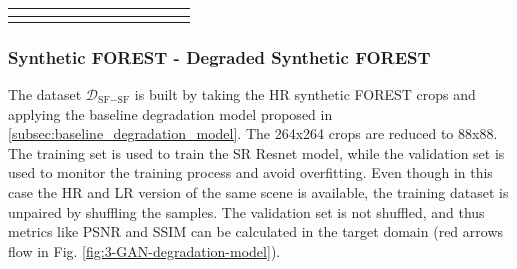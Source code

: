\begin{table}[H]
{\begin{tabular}{c|cccc|cccc|cccc}
                & \multicolumn{1}{c|}{}                                                        & \multicolumn{1}{c|}{}                                                                  &                                                        &                                                                   &                                                        & \multicolumn{1}{c|}{}                                                        &                                                        &                                                         &                                                        & \multicolumn{1}{c|}{}                                                        &                                                        & \multicolumn{1}{c|}{}                                                        \\ \hline
                & \multicolumn{1}{c|}{}                                                        & \multicolumn{1}{c|}{}                                                                  &                                                        &                                                                   &                                                        & \multicolumn{1}{c|}{}                                                        &                                                        &                                                         &                                                        & \multicolumn{1}{c|}{}                                                        &                                                        & \multicolumn{1}{c|}{}                                                       
    \end{tabular}%
    }
    \caption{}
    \label{tab:my-table}
    \end{table}


\subsubsection{Synthetic FOREST - Degraded Synthetic FOREST}
    The dataset $\mathcal{D}_{\text{SF}-\text{SF}}$ is built by taking the HR synthetic FOREST crops and applying the baseline degradation model proposed in \ref{subsec:baseline_degradation_model}. 
    The 264x264 crops are reduced to 88x88. The training set is used to train the SR Resnet model, while the validation set is used to monitor the training process and avoid overfitting. 
    Even though in this case the HR and LR version of the same scene is available, the training dataset is unpaired by shuffling the samples.
    The validation set is not shuffled, and thus metrics like PSNR and SSIM can be calculated in the target domain (red arrows flow in Fig. \ref{fig:3-GAN-degradation-model}). 

